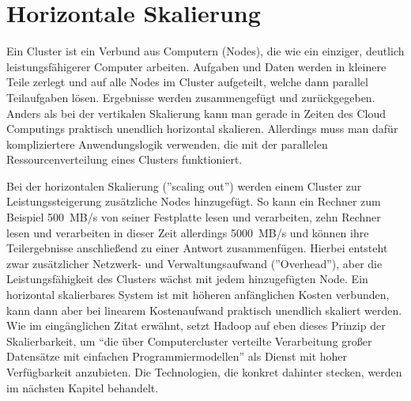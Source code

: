 \section{Horizontale Skalierung}
Ein Cluster ist ein Verbund aus Computern (Nodes), die wie ein einziger, deutlich leistungsfähigerer Computer arbeiten. Aufgaben und Daten werden in kleinere Teile zerlegt und auf alle Nodes im Cluster aufgeteilt, welche dann parallel Teilaufgaben lösen. Ergebnisse werden zusammengefügt und zurückgegeben. Anders als bei der vertikalen Skalierung kann man gerade in Zeiten des Cloud Computings praktisch unendlich horizontal skalieren. Allerdings muss man dafür kompliziertere Anwendungslogik verwenden, die mit der parallelen Ressourcenverteilung eines Clusters funktioniert.\cite{noauthor_what_nodate} 
\par
Bei der horizontalen Skalierung (''scaling out'') werden einem Cluster zur Leistungssteigerung zusätzliche Nodes hinzugefügt. So kann ein Rechner zum Beispiel 500 MB/s von seiner Festplatte lesen und verarbeiten, zehn Rechner lesen und verarbeiten in dieser Zeit allerdings 5000 MB/s und können ihre Teilergebnisse anschließend zu einer Antwort zusammenfügen. Hierbei entsteht zwar zusätzlicher Netzwerk- und Verwaltungsaufwand (''Overhead''), aber die Leistungsfähigkeit des Clusters wächst mit jedem hinzugefügten Node. Ein horizontal skalierbares System ist mit höheren anfänglichen Kosten verbunden, kann dann aber bei linearem Kostenaufwand praktisch unendlich skaliert werden.\cite{noauthor_horizontal_nodate}\\
Wie im eingänglichen Zitat erwähnt, setzt Hadoop auf eben dieses Prinzip der Skalierbarkeit, um ``die über Computercluster verteilte Verarbeitung großer Datensätze mit einfachen Programmiermodellen''\cite{noauthor_apache_nodate} als Dienst mit hoher Verfügbarkeit anzubieten. Die Technologien, die konkret dahinter stecken, werden im nächsten Kapitel behandelt.

